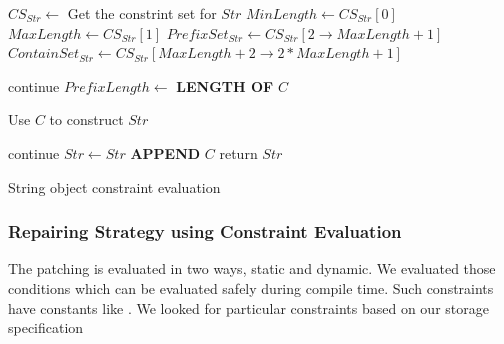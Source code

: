 \begin{algorithm}
\small
\DontPrintSemicolon
{}
\Begin
{
 $CS_{Str} \longleftarrow$ Get the constrint set for $Str$\;
 $MinLength \longleftarrow CS_{Str}[0]$\;
 $MaxLength \longleftarrow CS_{Str}[1]$\;
 $PrefixSet_{Str} \longleftarrow CS_{Str}[2 \rightarrow MaxLength + 1]$\;
 $ContainSet_{Str} \longleftarrow CS_{Str}[MaxLength +2  \rightarrow 2*MaxLength
 + 1]$\;
 
  {
   {
    continue\;
   }
   $PrefixLength \longleftarrow$ {\bf LENGTH OF} $C$\;
   
   {
     Use $C$ to construct $Str$\;
   }
  }
 
  {
   {
    continue\;
   }
   $Str \leftarrow Str$ {\bf APPEND} $C$\;
  }
  return $Str$\;
}
\caption{String object constraint evaluation}
 \label{algo:constraint}
\end{algorithm}

\subsubsection{Repairing Strategy using Constraint Evaluation}
\label{subsubsec:repairingStrategyConstraint}

The patching is evaluated in two ways, static and dynamic. We evaluated those
conditions which can be evaluated safely during compile time. Such constraints
have constants like . We looked for particular
constraints based on our storage specification 
